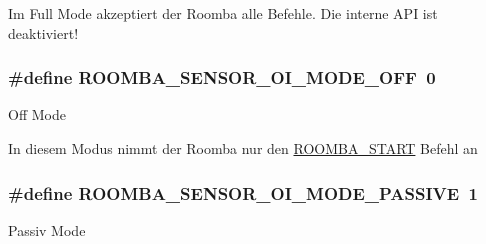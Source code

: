 Im Full Mode akzeptiert der Roomba alle Befehle. Die interne A\-P\-I ist deaktiviert! \hypertarget{group__roomba__oi__modes_ga161260ace993af2492a2edcc0110838d}{
\subsubsection[{R\-O\-O\-M\-B\-A\-\_\-\-S\-E\-N\-S\-O\-R\-\_\-\-O\-I\-\_\-\-M\-O\-D\-E\-\_\-\-O\-F\-F}]{\setlength{\rightskip}{0pt plus 5cm}\#define R\-O\-O\-M\-B\-A\-\_\-\-S\-E\-N\-S\-O\-R\-\_\-\-O\-I\-\_\-\-M\-O\-D\-E\-\_\-\-O\-F\-F~0}}\label{group__roomba__oi__modes_ga161260ace993af2492a2edcc0110838d}
Off Mode

In diesem Modus nimmt der Roomba nur den \hyperlink{group__roomba__commands__start_gaf1978389e19799d1dbf5e66303e86042}{R\-O\-O\-M\-B\-A\-\_\-\-S\-T\-A\-R\-T} Befehl an \hypertarget{group__roomba__oi__modes_ga66261dece9fcb24410381451bde2c953}{
\subsubsection[{R\-O\-O\-M\-B\-A\-\_\-\-S\-E\-N\-S\-O\-R\-\_\-\-O\-I\-\_\-\-M\-O\-D\-E\-\_\-\-P\-A\-S\-S\-I\-V\-E}]{\setlength{\rightskip}{0pt plus 5cm}\#define R\-O\-O\-M\-B\-A\-\_\-\-S\-E\-N\-S\-O\-R\-\_\-\-O\-I\-\_\-\-M\-O\-D\-E\-\_\-\-P\-A\-S\-S\-I\-V\-E~1}}\label{group__roomba__oi__modes_ga66261dece9fcb24410381451bde2c953}
Passiv Mode

